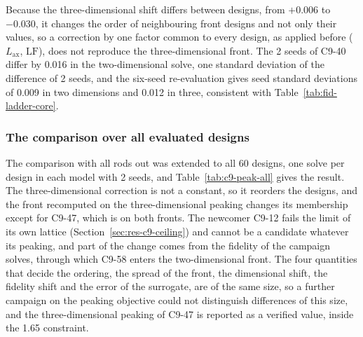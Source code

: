 Because the three-dimensional shift differs between designs, from
$+0.006$ to $-0.030$, it changes the order of neighbouring front designs
and not only their values, so a correction by one factor common to every
design, as applied before ($L_\mathrm{ax}$, $\mathrm{LF}$), does not
reproduce the three-dimensional front. The 2 seeds of C9-40 differ by 0.016 in
the two-dimensional solve, one standard deviation of the difference of
2 seeds, and the six-seed re-evaluation gives seed standard
deviations of 0.009 in two dimensions and 0.012 in three, consistent
with Table~\ref{tab:fid-ladder-core}.

\subsubsection{The comparison over all evaluated designs}
The comparison with all rods out was extended to all 60 designs, one
solve per design in each model with 2 seeds, and
Table~\ref{tab:c9-peak-all} gives the result. The three-dimensional
correction is not a constant, so it reorders the designs, and the front
recomputed on the three-dimensional peaking changes its membership
except for C9-47, which is on both fronts. The newcomer C9-12 fails the
limit of its own lattice (Section~\ref{sec:res-c9-ceiling}) and cannot
be a candidate whatever its peaking, and part of the change comes from
the fidelity of the campaign solves, through which C9-58 enters the
two-dimensional front. The four quantities that decide the ordering,
the spread of the front, the dimensional shift, the fidelity shift and
the error of the surrogate, are of the same size, so a further campaign
on the peaking objective could not distinguish differences of this
size, and the three-dimensional peaking of C9-47 is reported as a
verified value, inside the 1.65 constraint.

